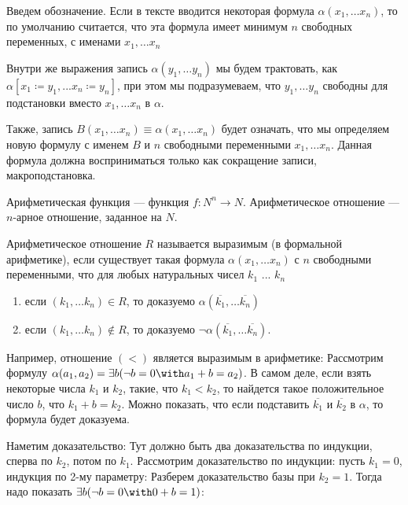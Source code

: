 Введем обозначение. Если в тексте вводится некоторая формула $\alpha(x_1, \dots x_n)$, то
по умолчанию считается, что эта формула имеет минимум $n$ свободных переменных, с именами
$x_1, \dots x_n$

Внутри же выражения запись $\alpha (y_1, \dots y_n)$ мы будем трактовать, как 
$\alpha [x_1 \coloneqq  y_1, ... x_n \coloneqq  y_n]$, при этом
мы подразумеваем, что $y_1, \dots y_n$ свободны для подстановки вместо $x_1, \dots x_n$ в $\alpha$.

Также, запись $B(x_1, \dots x_n) \equiv \alpha(x_1, \dots x_n)$ будет означать, что мы определяем
новую формулу с именем $B$ и $n$ свободными переменными $x_1, \dots x_n$. 
Данная формула должна восприниматься только как сокращение записи, макроподстановка.

\begin{definition}
Арифметическая функция --- функция $f: N^n \rightarrow N$.
Арифметическое отношение --- $n$-арное отношение, заданное на $N$.
\end{definition}

\begin{definition}
Арифметическое отношение $R$ называется выразимым (в формальной арифметике), если 
существует такая формула $\alpha (x_1, \dots x_n)$ с $n$ свободными переменными, 
что для любых натуральных чисел $k_1$ ... $k_n$
\begin{enumerate}
\item если $(k_1, \dots k_n) \in R$, то доказуемо $\alpha (\overline{k_1}, \dots \overline{k_n})$
\item если $(k_1, \dots k_n) \notin R $, то доказуемо $\neg \alpha (\overline{k_1}, \dots \overline{k_n})$.
\end{enumerate}
\end{definition}

Например, отношение $(<)$ является выразимым в арифметике:
Рассмотрим формулу $\alpha (a_1, a_2) = \exists b (\neg b = 0 \with a_1 + b = a_2)$.
В самом деле, если взять некоторые числа $k_1$ и $k_2$, такие, что $k_1 < k_2$, то найдется
такое положительное число $b$, что $k_1 + b = k_2$. Можно показать, что если подставить
$\overline{k_1}$ и $\overline{k_2}$ в $\alpha$, то формула будет доказуема. 

Наметим доказательство:
Тут должно быть два доказательства по индукции, сперва по $k_2$, потом по $k_1$.
Рассмотрим доказательство по индукции: пусть $k_1 = 0$, индукция по 2-му параметру:
Разберем доказательство базы при $k_2 = 1$. Тогда надо показать $\exists b (\neg b = 0 \with 0 + b = 1)$:

